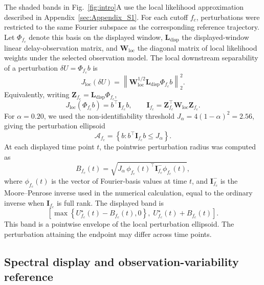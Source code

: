 The shaded bands in Fig.~\ref{fig:intro}A use the local likelihood approximation described in Appendix~\ref{sec:Appendix_S1}. For each cutoff \(f_c\), perturbations were restricted to the same Fourier subspace as the corresponding reference trajectory. Let \(\Phi_{f_c}\) denote this basis on the displayed window, \(\mathbf L_{\mathrm{disp}}\) the displayed-window linear delay-observation matrix, and \(\mathbf W_{\mathrm{loc}}\) the diagonal matrix of local likelihood weights under the selected observation model. The local downstream separability of a perturbation \(\delta U=\Phi_{f_c}b\) is
\[
J_{\mathrm{loc}}(\delta U)
=
\left\|\mathbf W_{\mathrm{loc}}^{1/2}\mathbf L_{\mathrm{disp}}\Phi_{f_c}b\right\|_2^2.
\]
Equivalently, writing \(\mathbf Z_{f_c}=\mathbf L_{\mathrm{disp}}\Phi_{f_c}\),
\[
J_{\mathrm{loc}}(\Phi_{f_c}b)
=
b^\top \mathbf I_{f_c}b,
\qquad
\mathbf I_{f_c}
=
\mathbf Z_{f_c}^\top \mathbf W_{\mathrm{loc}}\mathbf Z_{f_c}.
\]
For \(\alpha=0.20\), we used the non-identifiability threshold \(J_\alpha=4(1-\alpha)^2=2.56\), giving the perturbation ellipsoid
\[
\mathcal A_{f_c}
=
\left\{
b:
b^\top \mathbf I_{f_c}b
\leq
J_\alpha
\right\}.
\]
At each displayed time point \(t\), the pointwise perturbation radius was computed as
\[
B_{f_c}(t)
=
\sqrt{
J_\alpha\,
\phi_{f_c}(t)^\top
\mathbf I_{f_c}^{-}
\phi_{f_c}(t)
},
\]
where \(\phi_{f_c}(t)\) is the vector of Fourier-basis values at time \(t\), and \(\mathbf I_{f_c}^{-}\) is the Moore--Penrose inverse used in the numerical calculation, equal to the ordinary inverse when \(\mathbf I_{f_c}\) is full rank. The displayed band is
\[
\left[
\max\left\{
U^\star_{f_c}(t)-B_{f_c}(t),0
\right\},
\;
U^\star_{f_c}(t)+B_{f_c}(t)
\right].
\]
This band is a pointwise envelope of the local perturbation ellipsoid. The perturbation attaining the endpoint may differ across time points.

\subsection{Spectral display and observation-variability reference}

